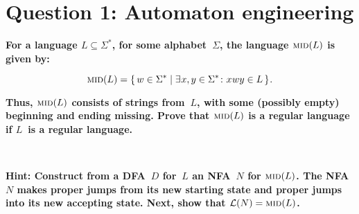 \section*{Question 1: Automaton engineering}
    \textbf{For a language $L \subseteq \Sigma^\ast$, for some alphabet~$\Sigma$, the language $\textsc{mid}(L)$ is given by:}
    
    \begin{displaymath}
      \textsc{mid}(L) =
      \lbrace \, w \in \Sigma^\ast \mid
      \exists \mkern1mu x,y \in \Sigma^\ast \colon
      x \mkern0.5mu wy \in L
      \, \rbrace \mkern1mu .
    \end{displaymath}
    
    \textbf{Thus, $\textsc{mid}(L)$ consists of strings from~$L$, with some (possibly empty) beginning and ending missing. Prove that $\textsc{mid}(L)$ is a regular language if $L$~is a regular language.}
    
    \\\medskip
    
    \textbf{Hint: Construct from a DFA~$D$ for~$L$ an NFA~$N$ for $\textsc{mid}(L)$. The NFA $N$ makes proper jumps from its new starting state and proper jumps into its new accepting state. Next, show that $\mathcal{L}(N) = \textsc{mid}(L)$.}
    
